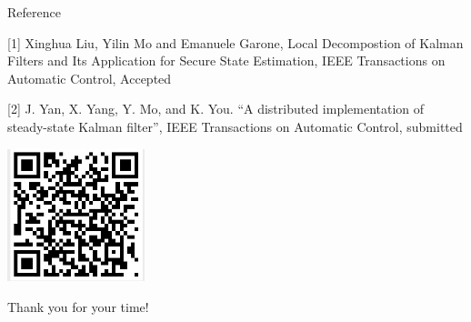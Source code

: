 \documentclass[10pt]{beamer}
\DeclareMathOperator{\1}{\textbf{1}}
\begin{document}
\begin{frame}{Reference}

  [1] Xinghua Liu, Yilin Mo and Emanuele Garone, Local Decompostion of Kalman Filters and Its Application for Secure State Estimation, IEEE Transactions on Automatic Control, Accepted

  [2] J. Yan, X. Yang, Y. Mo, and K. You. ``A distributed implementation of steady-state Kalman filter'', IEEE Transactions on Automatic Control, submitted

  \vspace{10pt}
  \centering
  \includegraphics[width=0.3\textwidth]{pic/qr.jpeg}
\end{frame}


\begin{frame}[standout]
  Thank you for your time! 
\end{frame}
\end{document}
